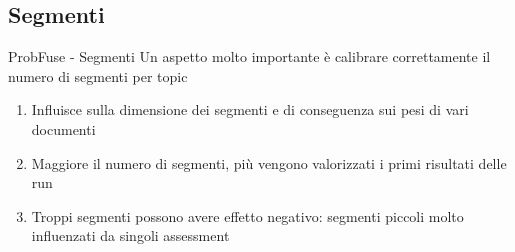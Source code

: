 \subsection{Segmenti}
\begin{frame}{ProbFuse - Segmenti}
	Un aspetto molto importante è calibrare correttamente il numero di segmenti per topic\\
	\bigskip
	\begin{enumerate}
		\item Influisce sulla dimensione dei segmenti e di conseguenza sui pesi di vari documenti
		\item Maggiore il numero di segmenti, più vengono valorizzati i primi risultati delle run
		\item Troppi segmenti possono avere effetto negativo: segmenti piccoli molto influenzati da singoli assessment
	\end{enumerate}
\end{frame}